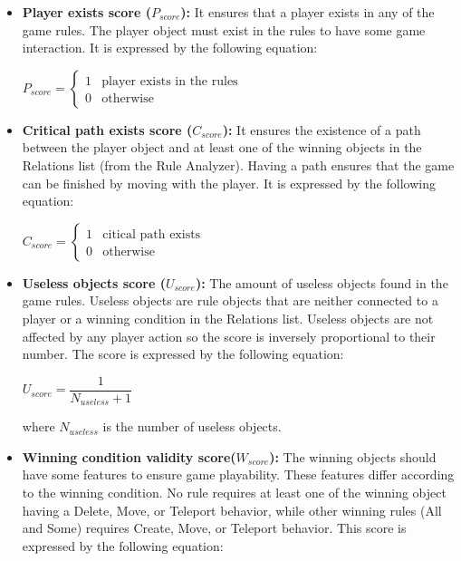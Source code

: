 \begin{itemize} \itemsep0pt \parskip0pt 
	\item \textbf{Player exists score ($P_{score}$):} It ensures that a player exists in any of the game rules. The player object must exist in the rules to have some game interaction. It is expressed by the following equation:
	\begin{center}
		$P_{score}= \begin{cases}
		               1 & \text{player exists in the rules}\\
		               0 & \text{otherwise}
		           \end{cases}$
		\end{center}
	\item \textbf{Critical path exists score ($C_{score}$):} It ensures the existence of a path between the player object and at least one of the winning objects in the Relations list (from the Rule Analyzer). Having a path ensures that the game can be finished by moving with the player. It is expressed by the following equation:
	\begin{center}
	$C_{score}= \begin{cases}
	               1 & \text{citical path exists}\\
	               0 & \text{otherwise}
	           \end{cases}$
	\end{center}
	\item \textbf{Useless objects score ($U_{score}$):} The amount of useless objects found in the game rules. Useless objects are rule objects that are neither connected to a player or a winning condition in the Relations list. Useless objects are not affected by any player action so the score is inversely proportional to their number. The score is expressed by the following equation:
	\begin{center}
	$U_{score} = \dfrac{1}{N_{useless} + 1}$
	\end{center}
	where $N_{useless}$ is the number of useless objects.
	\item \textbf{Winning condition validity score($W_{score}$):} The winning objects should have some features to ensure game playability. These features differ according to the winning condition. No rule requires at least one of the winning object having a Delete, Move, or Teleport behavior, while other winning rules (All and Some) requires Create, Move, or Teleport behavior. This score is expressed by the following equation:
	\begin{center}

\end{center}
\end{itemize}
